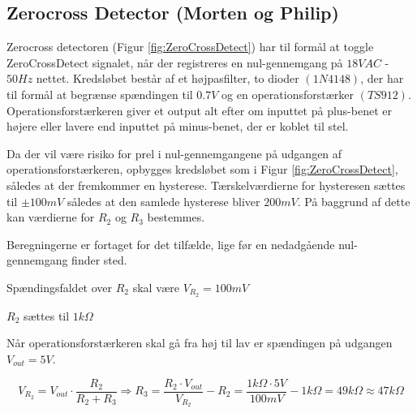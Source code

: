 \subsection{Zerocross Detector (Morten og Philip)}
Zerocross detectoren (Figur \ref{fig:ZeroCrossDetect}) har til formål at toggle ZeroCrossDetect signalet, når der registreres en nul-gennemgang på $18VAC$ - $50Hz$ nettet. Kredsløbet består af et højpasfilter, to dioder $(1N4148)$\cite{lib:1N4148}, der har til formål at begrænse spændingen til $0.7V$ og en operationsforstærker $(TS912)$\cite{lib:TS912}. Operationsforstærkeren giver et output alt efter om inputtet på plus-benet er højere eller lavere end inputtet på minus-benet, der er koblet til stel. 

Da der vil være risiko for prel i nul-gennemgangene på udgangen af operationsforstærkeren, opbygges kredsløbet som i Figur \ref{fig:ZeroCrossDetect}, således at der fremkommer en hysterese. Tærskelværdierne for hysteresen sættes til $\pm 100mV$ således at den samlede hysterese bliver $200mV$. På baggrund af dette kan værdierne for $R_{2}$ og $R_{3}$ bestemmes.

Beregningerne er fortaget for det tilfælde, lige før en nedadgående nul-gennemgang finder sted.

Spændingsfaldet over $R_{2}$ skal være $V_{R_{2}}=100mV$

$R_{2}$ sættes til $1k\Omega$

Når operationsforstærkeren skal gå fra høj til lav er spændingen på udgangen $V_{out}=5V$.

\begin{displaymath}
V_{R_{2}}=V_{out} \cdot \dfrac{R_{2}}{R_{2}+R_{3}} \Rightarrow
R_{3}=\dfrac{R_{2} \cdot V_{out}}{V_{R_{2}}}-R_{2}=
\dfrac{1k\Omega \cdot 5V}{100mV}-1k\Omega=49k\Omega\approx47k\Omega
\end{displaymath}

